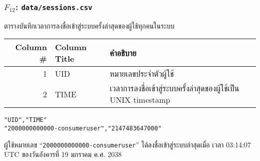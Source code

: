 \begin{minipage}{\textwidth}
\subsubsection[\texttt{data/sessions.csv}]{\texorpdfstring{$ F_{12} $}{File \#12}: \texttt{data/sessions.csv}}\label{subsubsec:csv-f12}

ตารางบันทึกเวลาการลงชื่อเข้าสู่ระบบครั้งล่าสุดของผู้ใช้ทุกคนในระบบ

\begin{tabular}[!hbt]{| r | >{\ttfamily}p{15ex}<{\rmfamily} | p{36ex} |}
\hline
Column \#       & \rmfamily Column Title                & คำอธิบาย\\
\hline
1               & UID                                   & หมายเลขประจำตัวผู้ใช้\\
2               & TIME                                  & เวลาการลงชื่อเข้าสู่ระบบครั้งล่าสุดของผู้ใช้เป็น UNIX timestamp\\
\hline
\end{tabular}


\begin{lstlisting}[caption={\texttt{data/sessions.csv}}]
"UID","TIME"
"2000000000000-consumeruser","2147483647000"
\end{lstlisting}

\begin{description}[labelwidth=*]
    \item[$ \Rightarrow $] ผู้ใช้หมายเลข ``\texttt{2000000000000-consumeruser}'' ได้ลงชื่อเข้าสู่ระบบล่าสุดเมื่อ
เวลา 03:14:07 UTC ของวันอังคารที่ 19 มกราคม ค.ศ. 2038
\end{description}
\end{minipage}


\vspace{3\baselineskip}


